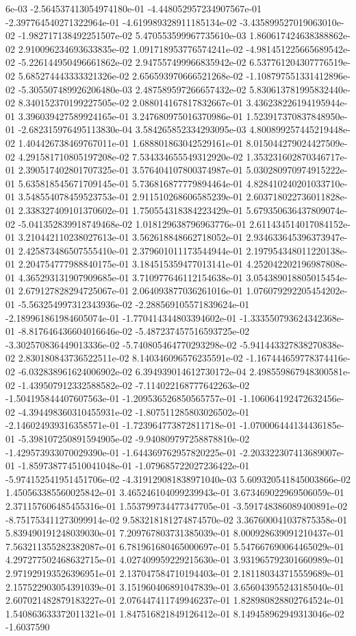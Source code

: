 6e-03	-2.564537413054974180e-01	-4.448052957234907567e-01	-2.397764540271322964e-01	-4.619989328911185134e-02	-3.435899527019063010e-02	-1.982717138492251507e-02	5.470553599967735610e-03	1.860617424638388862e-02	2.910096234693633835e-02	1.091718953776574241e-02	-4.981451225665689542e-02	-5.226144950496661862e-02	2.947557499966835942e-02	6.537761204307776519e-02	5.685274443333321326e-02	2.656593970666521268e-02	-1.108797551331412896e-02	-5.305507489926206480e-03	2.487589597266657432e-02	5.830613781995832440e-02	8.340152370199227505e-02	2.088014167817832667e-01	3.436238226194195944e-01	3.396039427589924165e-01	3.247680975016370986e-01	1.523917370837848950e-01	-2.682315976495113830e-04	3.584265852334293095e-03	4.800899257445219448e-02	1.404426738469767011e-01	1.688801863042529161e-01	8.015044279024427509e-02	4.291581710805197208e-02	7.534334655549312920e-02	1.353231602870346717e-01	2.390517402801707325e-01	3.576404107800374987e-01	5.030280970974915222e-01	5.635818545671709145e-01	5.736816877779894464e-01	4.828410240201033710e-01	3.548554078459523753e-01	2.911510268606585239e-01	2.603718022736011828e-01	2.338327409101370602e-01	1.750554318384223429e-01	5.679350636437809074e-02	-5.041352839918749468e-02	1.018129638796963776e-01	2.611434514017084152e-01	3.210442110238027613e-01	3.562618848662718052e-01	2.934633645396373947e-01	2.425873486507555410e-01	2.379601011173544944e-01	2.197954348011220138e-01	2.204754777988840175e-01	3.184515359477013141e-01	4.252042202196987808e-01	4.365293131907909685e-01	3.710977646112154638e-01	3.054389018805015454e-01	2.679127828294725067e-01	2.064093877036261016e-01	1.076079292205454202e-01	-5.563254997312343936e-02	-2.288569105571839624e-01	-2.189961861984605074e-01	-1.770414344803394602e-01	-1.333550793624342368e-01	-8.817646436604016646e-02	-5.487237457516593725e-02	-3.302570836449013336e-02	-5.740805464770293298e-02	-5.941443327838270838e-02	2.830180843736522511e-02	8.140346096576235591e-02	-1.167444659778374416e-02	-6.032838961624006902e-02	6.394939014612730172e-04	2.498559867948300581e-02	-1.439507912332588582e-02	-7.114022168777642263e-02	-1.504195844407607563e-01	-1.209536526850565757e-01	-1.106064192472632456e-02	-4.394498360310455931e-02	-1.807511285803026502e-01	-2.146024939316358571e-01	-1.723964773872811718e-01	-1.070006444134436185e-01	-5.398107250891594905e-02	-9.940809797258878810e-02	-1.429573933070029390e-01	-1.644369762957820225e-01	-2.203322307413689007e-01	-1.859738774510041048e-01	-1.079685722027236422e-01	-5.974152541951451706e-02	-4.319129081838971040e-03	5.609320541845003866e-02	1.450563385560025842e-01	3.465246104099239943e-01	3.673469022969506059e-01	2.371157606485455316e-01	1.553799734477347705e-01	-3.591748386089400891e-02	-8.751753411273099914e-02	9.583218181274874570e-02	3.367600041037875358e-01	5.839490191248039030e-01	7.209767803731385039e-01	8.000928639091210437e-01	7.563211355282382087e-01	6.781961680465000697e-01	5.547667690064465029e-01	4.297277502468632715e-01	4.027409959229215630e-01	3.931965792301660989e-01	2.971929193526396951e-01	2.137047584710194403e-01	2.181180343715559689e-01	2.157522903054391039e-01	3.151960406891047839e-01	3.656043955243185040e-01	2.607021482879183227e-01	2.076447411749946237e-01	1.828980828802764524e-01	1.540863633372011321e-01	1.847516821849126412e-01	8.149458962949313046e-02	-1.6037590